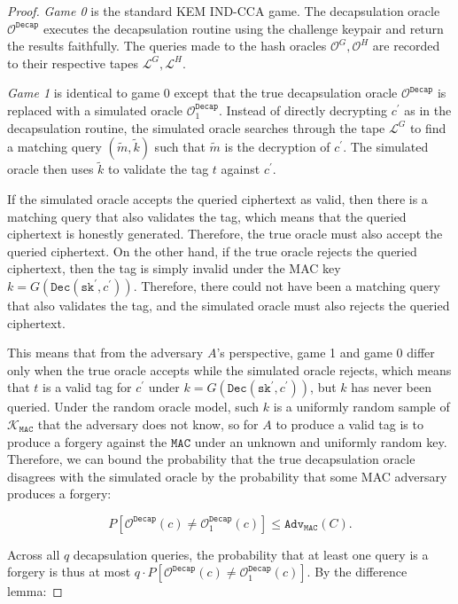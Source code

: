 \documentclass[runningheads]{llncs}
\newcommand{\decrypt}{\texttt{Dec}}
\newcommand{\decap}{\texttt{Decap}}
\newcommand{\mac}{\texttt{MAC}}
\newcommand{\sk}{\texttt{sk}}
\newcommand{\adv}{\texttt{Adv}}
\begin{document}
\begin{proof}
    \emph{Game 0} is the standard KEM IND-CCA game. The decapsulation oracle $\mathcal{O}^\decap$ executes the decapsulation routine using the challenge keypair and return the results faithfully. The queries made to the hash oracles $\mathcal{O}^G, \mathcal{O}^H$ are recorded to their respective tapes $\mathcal{L}^G, \mathcal{L}^H$.

    \emph{Game 1} is identical to game 0 except that the true decapsulation oracle $\mathcal{O}^\decap$ is replaced with a simulated oracle $\mathcal{O}^\decap_1$. Instead of directly decrypting $c^\prime$ as in the decapsulation routine, the simulated oracle searches through the tape $\mathcal{L}^G$ to find a matching query $(\tilde{m}, \tilde{k})$ such that $\tilde{m}$ is the decryption of $c^\prime$. The simulated oracle then uses $\tilde{k}$ to validate the tag $t$ against $c^\prime$.

    If the simulated oracle accepts the queried ciphertext as valid, then there is a matching query that also validates the tag, which means that the queried ciphertext is honestly generated. Therefore, the true oracle must also accept the queried ciphertext. On the other hand, if the true oracle rejects the queried ciphertext, then the tag is simply invalid under the MAC key $k = G(\decrypt(\sk^\prime, c^\prime))$. Therefore, there could not have been a matching query that also validates the tag, and the simulated oracle must also rejects the queried ciphertext.

    This means that from the adversary $A$'s perspective, game 1 and game 0 differ only when the true oracle accepts while the simulated oracle rejects, which means that $t$ is a valid tag for $c^\prime$ under $k = G(\decrypt(\sk^\prime, c^\prime))$, but $k$ has never been queried. Under the random oracle model, such $k$ is a uniformly random sample of $\mathcal{K}_\mac$ that the adversary does not know, so for $A$ to produce a valid tag is to produce a forgery against the $\mac$ under an unknown and uniformly random key. Therefore, we can bound the probability that the true decapsulation oracle disagrees with the simulated oracle by the probability that some MAC adversary produces a forgery:

    \begin{equation*}
        P\left[\mathcal{O}^\decap(c) \neq \mathcal{O}^\decap_1(c)\right]
        \leq \adv_\texttt{MAC}(C).
    \end{equation*}

    Across all $q$ decapsulation queries, the probability that at least one query is a forgery is thus at most $q \cdot P\left[\mathcal{O}^\decap(c) \neq \mathcal{O}^\decap_1(c)\right]$. By the difference lemma:


\end{proof}
\end{document}
